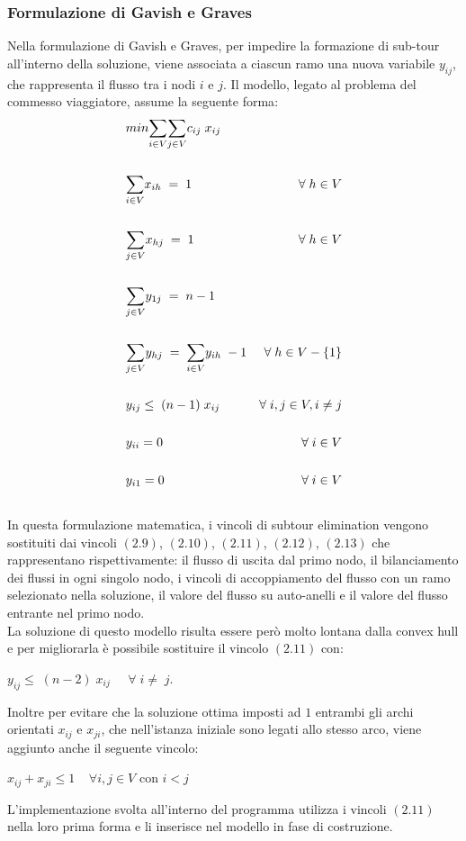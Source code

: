 \subsubsection{Formulazione di Gavish e Graves}
Nella formulazione di Gavish e Graves, per impedire la formazione di sub-tour all'interno della soluzione, viene associata a ciascun ramo una nuova variabile $y_{ij}$, che rappresenta il flusso tra i nodi $i$ e $j$. Il modello, legato al problema del commesso viaggiatore, assume la seguente forma\cite{COMPACT_CITE}:
\begin{align}
& min\underset{i\in V}\sum{\underset{j\in V}\sum{c_{ij}\; x_{ij}}} \\ \notag \\
& \underset{i\in V}\sum{x_{ih}}\;=\;1 & \forall\;h\in V \\ \notag\\
& \underset{j\in V}\sum{x_{hj}}\;=\;1 & \forall\;h\in V \\ \notag\\
& \underset{j\in V}\sum{y_{1j}}\;=\;n-1\\ \notag\\
& \underset{j\in V}\sum{y_{hj}}\;=\;\underset{i\in V}\sum{y_{ih}}\;-1 & \forall\;h\in V-\{1\}\\ \notag\\
& y_{ij}\leq\;(n-1)\;x_{ij} & \forall\;i,j\in V, i\neq j\\ \notag\\
& y_{ii}=0 & \forall\;i\in V\\\notag\\
& y_{i1}=0 & \forall\;i\in V\\\notag
\end{align}
In questa formulazione matematica, i vincoli di subtour elimination vengono sostituiti dai vincoli $(2.9)$, $(2.10)$, $(2.11)$, $(2.12)$, $(2.13)$ che rappresentano rispettivamente: il flusso di uscita dal primo nodo, il bilanciamento dei flussi in ogni singolo nodo, i vincoli di accoppiamento del flusso con un ramo selezionato nella soluzione, il valore del flusso su auto-anelli e il valore del flusso entrante nel primo nodo.\\
La soluzione di questo modello risulta essere però molto lontana dalla convex hull e per migliorarla è possibile sostituire il vincolo $(2.11)$ con: \\
\begin{center}
$y_{ij}\leq\;(n-2)\;x_{ij} \;\;\;\;\;\forall\; i\neq \; j$.\\
\end{center} 
Inoltre per evitare che la soluzione ottima imposti ad $1$ entrambi gli archi orientati $x_{ij}$ e $x_{ji}$, che nell'istanza iniziale sono legati allo stesso arco, viene aggiunto anche il seguente vincolo:
\begin{center}
$x_{ij}+x_{ji}\leq 1\;\;\;\; \forall i,j \in V$ con $i < j$
\end{center}
L'implementazione svolta all'interno del programma utilizza i vincoli $(2.11)$ nella loro prima forma e li inserisce nel modello in fase di costruzione.

